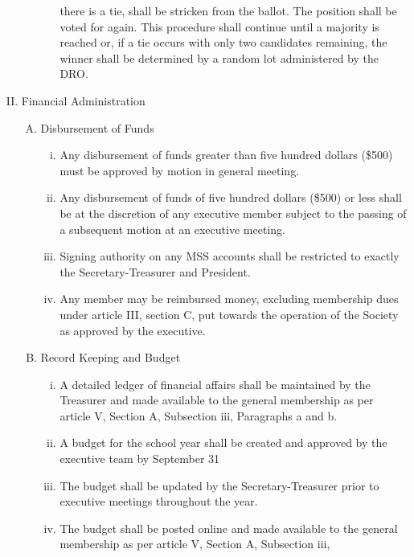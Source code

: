 \documentclass[11pt]{article}
\begin{document}
\begin{enumerate}[I.]
\begin{enumerate}[A)]
\begin{enumerate}[i)]
            there is a tie, shall be stricken from the ballot. The position
            shall be voted for again. This procedure shall continue until a
            majority is reached or, if a tie occurs with only two candidates
            remaining, the winner shall be determined by a random lot
            administered by the DRO.
        \end{enumerate}
    \end{enumerate}
  \item Financial Administration
    \begin{enumerate}[A)]
      \item Disbursement of Funds
        \begin{enumerate}[i)]
          \item Any disbursement of funds greater than five hundred dollars
            (\$500) must be approved by motion in general meeting.
          \item Any disbursement of funds of five hundred dollars (\$500) or
            less shall be at the discretion of any executive member subject to
            the passing of a subsequent motion at an executive meeting.
          \item Signing authority on any MSS accounts shall be restricted to
            exactly the Secretary-Treasurer and President.
          \item Any member may be reimbursed money, excluding membership dues
            under article III, section C, put towards the operation of the
            Society as approved by the executive.
        \end{enumerate}
      \item Record Keeping and Budget
        \begin{enumerate}[i)]
          \item A detailed ledger of financial affairs shall be maintained by
            the Treasurer and made available to the general membership as per
            article V, Section A, Subsection iii, Paragraphs a and b.
          \item A budget for the school year shall be created and approved by
            the executive team by September 31
          \item The budget shall be updated by the Secretary-Treasurer prior to
            executive meetings throughout the year.
          \item The budget shall be posted online and made available to the
            general membership as per article V, Section A, Subsection iii,

\end{enumerate}
\end{enumerate}
\end{enumerate}
\end{document}
